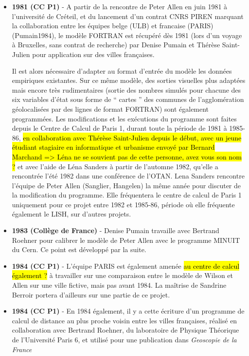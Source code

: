 \begin{itemize}[label=\textbullet]

\item \textbf{1981 (CC P1)} - A partir de la rencontre  de Peter Allen en juin 1981 à l’université de Créteil, et du lancement d’un contrat CNRS PIREN marquant la collaboration entre les équipes belge (ULB) et francaise (PARIS) (Pumain1984), le modèle FORTRAN est récupéré dès 1981 (lors d’un voyage à Bruxelles, sans contrat de recherche) par Denise Pumain et Thérèse Saint-Julien pour application sur des villes françaises.

Il est alors nécessaire d’adapter au format d’entrée du modèle les données empiriques existantes. Sur ce même modèle, des sorties visuelles plus adaptées mais encore très rudimentaires (sortie des nombres simulés pour chacune des six variables d’état sous forme de \enquote{ cartes } des communes de l’agglomération géolocalisées par des lignes de format FORTRAN) sont également programmées. Les modifications et les exécutions du programme sont faites depuis le Centre de Calcul de Paris 1, durant toute la période de 1981 à 1985-86, \hl{en collaboration avec Thérèse Saint-Julien depuis le début, avec un jeune étudiant stagiaire en informatique et urbanisme envoyé par Bernard Marchand => Léna ne se souvient pas de cette personne, avez vous son nom ?} et avec l’aide de Léna Sanders à partir de l’automne 1982, qu'elle a rencontrée l'été 1982 dans une conférence de l'OTAN. Lena Sanders rencontre l'équipe de Peter Allen (Sanglier, Hangelen) la même année pour discuter de la modification du programme. Elle fréquentera le centre de calcul de Paris 1 uniquement pour ce projet entre 1982 et 1985-86, période où elle fréquente également le LISH, sur d'autres projets.

\item \textbf{1983 (Collège de France)} - Denise Pumain travaille avec Bertrand Roehner pour calibrer le modèle de Peter Allen avec le programme MINUIT du Cern. Ce point est développé par la suite.

\item \textbf{1984 (CC P1)} - L'équipe PARIS est également amenée \hl{au centre de calcul également ?} à travailler sur une comparaison entre le modèle de Wilson et Allen sur une ville fictive, mais pas avant 1984. La maîtrise de Sandrine Berroir portera d'ailleurs sur une partie de ce projet.

\item \textbf{1984 (CC P1)} - En 1984 également, il y a cette écriture d’un programme de calcul de distance au plus proche voisin entre les villes françaises, réalisé en collaboration avec Bertrand Roehner, du laboratoire de Physique Théorique de l’Université Paris 6, et utilisé pour une publication dans \textit{Geoscopie de la France} \autocite{Theoquant1984}


\end{itemize}
